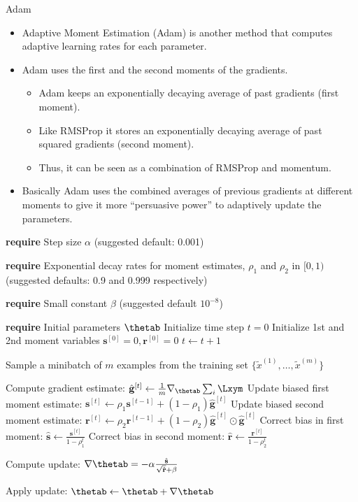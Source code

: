 \begin{vbframe}{Adam}
  \begin{itemize}
    \item Adaptive Moment Estimation (Adam) is another method that computes adaptive learning rates for each parameter.
    \item Adam uses the first and the second moments of the gradients.
      \begin{itemize}
        \item Adam keeps an exponentially decaying average of past gradients (first moment).
        \item Like RMSProp it stores an exponentially decaying average of past squared gradients (second moment).
        \item Thus, it can be seen as a combination of RMSProp and momentum.
      \end{itemize}
    \item Basically Adam uses the combined averages of previous gradients at different moments to give it more \enquote{persuasive power} to adaptively update the parameters.
  \end{itemize}
  
  
\framebreak

\begin{algorithm}[H]
  \scriptsize 
  \caption{Adam}
  \begin{algorithmic}[1]
  \State \textbf{require} Step size $\alpha$ (suggested default: 0.001) \strut
  \State \parbox[t]{\dimexpr\linewidth-\algorithmicindent}{\textbf{require} Exponential decay rates for moment estimates, $\rho_1$ and $\rho_2$ in $[0,1)$ (suggested defaults: 0.9 and 0.999 respectively)} \strut
  \State \parbox[t]{\dimexpr\linewidth-\algorithmicindent}{\textbf{require} Small constant $\beta$ (suggested default $10^{-8}$) \strut}
  \State \textbf{require} Initial parameters $\thetab$ 
  \State Initialize time step $t = 0$
  \State Initialize 1st and 2nd moment variables $\mathbf{s}^{[0]} = 0, \mathbf{r}^{[0]} = 0$
      \State $t \leftarrow t + 1$
      \State \parbox[t]{\dimexpr\linewidth-\algorithmicindent}{Sample a minibatch of $m$ examples from the training set $\{\tilde{x}^{(1)},\dots,\tilde{x}^{(m)}\}$ \strut}
      \State Compute gradient estimate: $\hat{\mathbf{g}}^{[t]} \leftarrow \frac{1}{m} \nabla_{\thetab} \sum_{i} \Lxym$
      \State Update biased first moment estimate: $\mathbf{s}^{[t]} \leftarrow \rho_1 \mathbf{s}^{[t-1]}  + (1 - \rho_1) \hat{\mathbf{g}}^{[t]}$
      \State Update biased second moment estimate: $\mathbf{r}^{[t]} \leftarrow \rho_2 \mathbf{r}^{[t-1]}  + (1 - \rho_2) \hat{\mathbf{g}}^{[t]} \odot \hat{\mathbf{g}}^{[t]}$
      \State Correct bias in first moment: $\hat{\mathbf{s}} \leftarrow \frac{\mathbf{s}^{[t]} }{1-\rho_1^t}$
      \State Correct bias in second moment: $\hat{\mathbf{r}} \leftarrow \frac{\mathbf{r}^{[t]} }{1-\rho_2^t}$
      \State \parbox[t]{\dimexpr\linewidth-\algorithmicindent}{Compute update: $\nabla\thetab = - \alpha \frac{\hat{\mathbf{s}}}{\sqrt{\hat{\mathbf{r}}} + \beta}$ \strut}
      \State Apply update: $\thetab \leftarrow \thetab + \nabla\thetab$
      

\end{algorithmic}
\end{algorithm}
\end{vbframe}
